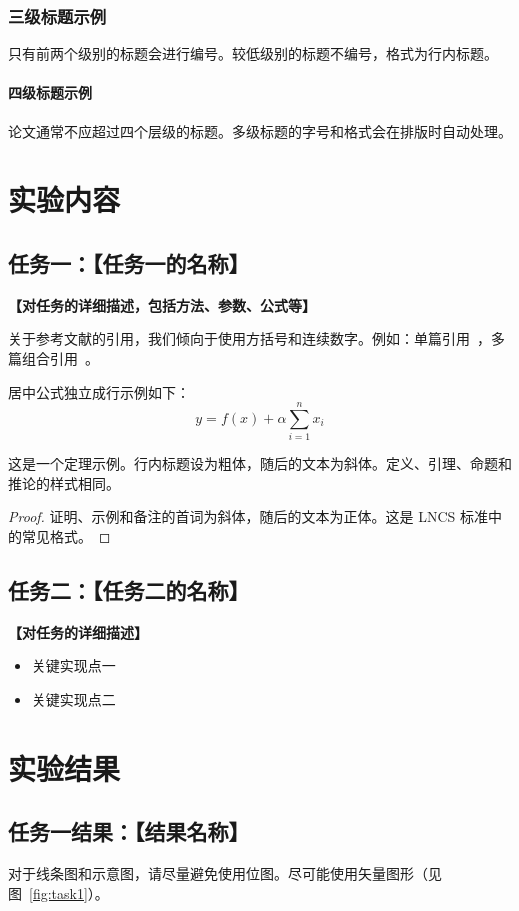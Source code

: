 \documentclass[runningheads]{ctexart}
\begin{document}
\subsubsection{三级标题示例}
只有前两个级别的标题会进行编号。较低级别的标题不编号，格式为行内标题。

\paragraph{四级标题示例}
论文通常不应超过四个层级的标题。多级标题的字号和格式会在排版时自动处理。

\section{实验内容}
\subsection{任务一：【任务一的名称】}
\textbf{【对任务的详细描述，包括方法、参数、公式等】}

关于参考文献的引用，我们倾向于使用方括号和连续数字。例如：单篇引用~\cite{ref_article1}，多篇组合引用~\cite{ref_article1,ref_lncs1,ref_book1}。

\noindent 居中公式独立成行示例如下：
\begin{equation}
    y = f(x) + \alpha \sum_{i=1}^{n} x_i
\end{equation}

\begin{theorem}
这是一个定理示例。行内标题设为粗体，随后的文本为斜体。定义、引理、命题和推论的样式相同。
\end{theorem}
\begin{proof}
证明、示例和备注的首词为斜体，随后的文本为正体。这是 LNCS 标准中的常见格式。
\end{proof}

\subsection{任务二：【任务二的名称】}
\textbf{【对任务的详细描述】}
\begin{itemize}
    \item 关键实现点一
    \item 关键实现点二
\end{itemize}


\section{实验结果}
\subsection{任务一结果：【结果名称】}
对于线条图和示意图，请尽量避免使用位图。尽可能使用矢量图形（见图~\ref{fig:task1}）。
\end{document}
